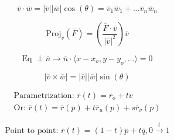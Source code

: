 \documentclass[12pt]{article}
\begin{document}
\begin{multicols}{2}

  \begin{equation*}
    \overline{v}\cdot\overline{w}=|\overline{v}||\overline{w}|\cos(\theta)=\overline{v}_1\overline{w}_1+\dots\overline{v}_n\overline{w}_n
    
  \end{equation*}

  \begin{equation*}
    \text{Proj}_{\overline{v}}(\overline{F})=\left( \dfrac{\overline{F}\cdot\overline{v}}{|\overline{v}|^2} \right)\overline{v}
  \end{equation*}

\end{multicols}

\vspace{-60pt}

\begin{multicols}{2}

  \begin{equation*}
    \text{Eq }\perp\overline{n}\rightarrow \overline{n}\cdot\langle x-x_o, y-y_o,\dots\rangle=0
  \end{equation*}
    
  \begin{equation*}
    |\overline{v}\times\overline{w}|=|\overline{v}||\overline{w}|\sin(\theta)
  \end{equation*}

\end{multicols}

\vspace{-30pt}

\begin{multicols}{2}

  \begin{equation*}
    \begin{split}
    \text{Parametrization: }\overline{r}(t)=\overline{r}_o+t\overline{v}\\
    \text{Or: }\overline{r}(t)=\overline{r}(p)+t\overline{r}_u(p)+s\overline{r}_v(p)
  \end{split}
  \end{equation*}
    
  \begin{equation*}
    \text{Point to point: }\overline{r}(t)=(1-t)\overline{p}+t\overline{q}, 0\xrightarrow{t}1
  \end{equation*}

\end{multicols}
\end{document}
